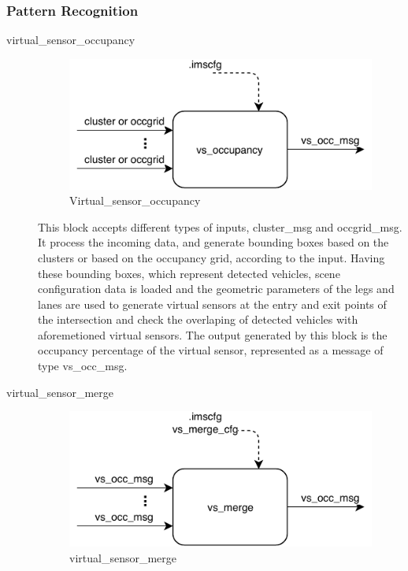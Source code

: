 \subsubsection{Pattern Recognition}
\begin{description}

\item[virtual\_sensor\_occupancy] \hfill

\begin{figure}[ht!]
\centering
\includegraphics[scale=1]{fig/3/vs_occ.pdf}
\caption{Virtual\_sensor\_occupancy}
\label{vehicle_counter}
\end{figure}

This block accepts different types of inputs, cluster\_msg and occgrid\_msg. It process the incoming data, and generate bounding boxes based on the clusters or based on the occupancy grid, according to the input. Having these bounding boxes, which represent detected vehicles, scene configuration data is loaded and the geometric parameters of the legs and lanes are used to generate virtual sensors at the entry and exit points of the intersection and check the overlaping of detected vehicles with aforemetioned virtual sensors. The output generated by this block is the occupancy percentage of the virtual sensor, represented as a message of type vs\_occ\_msg.




\item[virtual\_sensor\_merge] \hfill
\begin{figure}[ht!]
\centering
\includegraphics[scale=1]{fig/3/vs_merge.pdf}
\caption{virtual\_sensor\_merge}
\label{virtual_sensor_merge}
\end{figure}


\end{description}

